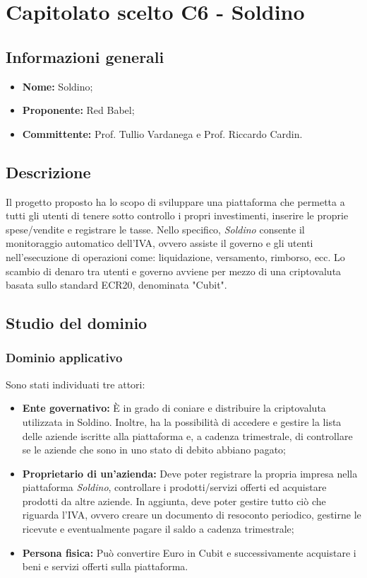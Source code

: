 \section{Capitolato scelto C6 - Soldino}
\subsection{Informazioni generali}
% 
\begin{itemize}
\item
\textbf{Nome:} Soldino;
\item
\textbf{Proponente:} Red Babel;
\item
\textbf{Committente:} Prof. Tullio Vardanega e Prof. Riccardo Cardin.
\end{itemize}

\subsection{Descrizione}
Il progetto proposto ha lo scopo di sviluppare una piattaforma che permetta a tutti gli utenti di tenere sotto controllo i propri investimenti, inserire le proprie spese/vendite e registrare le tasse. Nello specifico, \textit{Soldino} consente il monitoraggio automatico dell'IVA, ovvero assiste il governo e gli utenti nell'esecuzione di operazioni come: liquidazione, versamento, rimborso, ecc. Lo scambio di denaro tra utenti e governo avviene per mezzo di una criptovaluta basata sullo standard ECR20\glo{}, denominata "Cubit"\glo{}. 


\subsection{Studio del dominio}
\subsubsection{Dominio applicativo}
Sono stati individuati tre attori:
\begin{itemize}	
	\item \textbf{Ente governativo: }\`E in grado di coniare e distribuire la 
	criptovaluta utilizzata in Soldino. Inoltre, ha la possibilità di accedere e gestire la lista delle aziende iscritte alla piattaforma e, a cadenza trimestrale, di controllare se le aziende che sono in uno stato di debito abbiano pagato;
	\item \textbf{Proprietario di un'azienda:} Deve poter registrare la propria 
impresa nella piattaforma \textit{Soldino}, controllare i prodotti/servizi offerti ed acquistare 
prodotti da altre aziende. In aggiunta, deve poter gestire tutto ciò che riguarda l'IVA, ovvero creare un documento di resoconto periodico,
gestirne le ricevute e eventualmente pagare il saldo a cadenza trimestrale;
	\item \textbf{Persona fisica\glo: }Può convertire Euro in Cubit e 
successivamente acquistare i beni e servizi offerti sulla piattaforma. 
\end{itemize}
